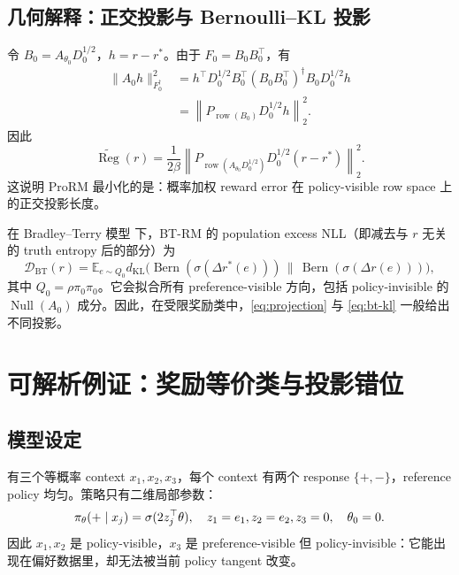\documentclass[UTF8,11pt,a4paper,fontset=none]{ctexart}
\newcommand{\E}{\mathbb{E}}
\newcommand{\Reg}{\operatorname{Reg}}
\newcommand{\Null}{\operatorname{Null}}
\newcommand{\row}{\operatorname{row}}
\newcommand{\sig}{\sigma}
\begin{document}
\subsection{几何解释：正交投影与 Bernoulli--KL 投影}

令 $B_0=A_{\theta_0}D_0^{1/2}$，$h=r-r^*$。由于 $F_0=B_0B_0^\top$，有
\begin{align}
\|A_0h\|_{F_0^\dagger}^{2}
&=h^\top D_0^{1/2}B_0^\top(B_0B_0^\top)^\dagger B_0D_0^{1/2}h\\
&=\left\|P_{\row(B_0)}D_0^{1/2}h\right\|_2^2.
\end{align}
因此
\begin{equation}
\boxed{
\widetilde{\Reg}(r)=\frac{1}{2\beta}
\left\|P_{\row(A_{\theta_0}D_0^{1/2})}D_0^{1/2}(r-r^*)\right\|_2^2.
}
\label{eq:projection}
\end{equation}
这说明 ProRM 最小化的是：概率加权 reward error 在 policy-visible row space 上的正交投影长度。

在 Bradley--Terry 模型 \cite{bt} 下，BT-RM 的 population excess NLL（即减去与 $r$ 无关的 truth entropy 后的部分）为
\begin{equation}
\mathcal D_{\mathrm{BT}}(r)=\E_{e\sim Q_0}
 d_{\mathrm{KL}}\!\bigl(
\operatorname{Bern}(\sig(\Delta r^*(e)))\,\|\,
\operatorname{Bern}(\sig(\Delta r(e)))
\bigr),
\label{eq:bt-kl}
\end{equation}
其中 $Q_0=\rho\pi_0\pi_0$。它会拟合所有 preference-visible 方向，包括 policy-invisible 的 $\Null(A_0)$ 成分。因此，在受限奖励类中，\cref{eq:projection} 与 \cref{eq:bt-kl} 一般给出不同投影。

\section{可解析例证：奖励等价类与投影错位}

\subsection{模型设定}

有三个等概率 context $x_1,x_2,x_3$，每个 context 有两个 response $\{+,-\}$，reference policy 均匀。策略只有二维局部参数：
\[
\pi_\theta(+\mid x_j)=\sig(2z_j^\top\theta),
\quad z_1=e_1,\\ z_2=e_2,\\ z_3=0,
\quad \theta_0=0.
\]
因此 $x_1,x_2$ 是 policy-visible，$x_3$ 是 preference-visible 但 policy-invisible：它能出现在偏好数据里，却无法被当前 policy tangent 改变。
\end{document}
